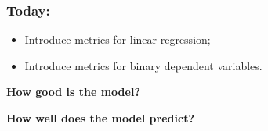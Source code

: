 \documentclass[aspectratio=169]{beamer}
\theoremstyle{principle}
\begin{document}
\begin{frame}
\frametitle{Today:}

\begin{itemize}
\item Introduce metrics for linear regression;
\bigskip
\bigskip
\bigskip

\item Introduce metrics for binary dependent variables.

\end{itemize}

\end{frame}

\begin{frame}

\begin{center}
\Huge\textbf{How good is the model?}\\
\end{center}

\end{frame}

\begin{frame}

\begin{center}
\Huge\textbf{How well does the model predict?}\\
\end{center}

\end{frame}
\end{document}
